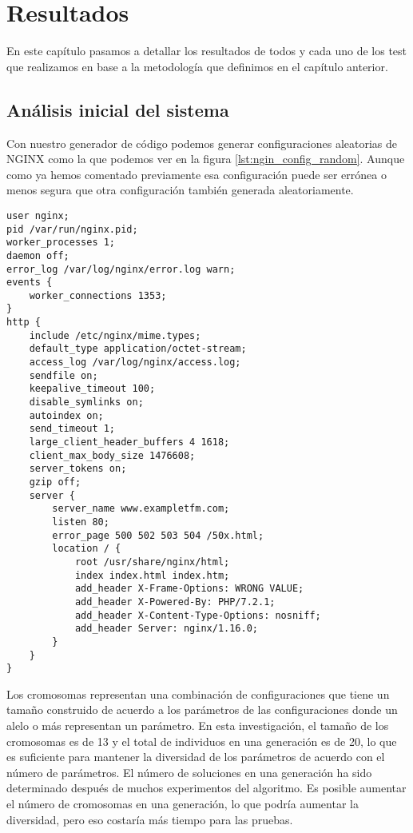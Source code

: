 \chapter{Resultados}

En este capítulo pasamos a detallar los resultados de todos y cada uno de los test que realizamos en base a la metodología que definimos en el capítulo anterior.

\section{Análisis inicial del sistema}

Con nuestro generador de código podemos generar configuraciones aleatorias de NGINX como la que podemos ver en la figura \ref{lst:ngin_config_random}. Aunque como ya hemos comentado previamente esa configuración puede ser errónea o menos segura que otra configuración también generada aleatoriamente.

\begin{lstlisting}[label={lst:nginx_config_random},caption={Ejemplo de configuración aleatoria de NGINX}]
user nginx;
pid /var/run/nginx.pid;
worker_processes 1;
daemon off;
error_log /var/log/nginx/error.log warn;
events {
    worker_connections 1353;
}
http {
    include /etc/nginx/mime.types;
    default_type application/octet-stream;
    access_log /var/log/nginx/access.log;
    sendfile on;
    keepalive_timeout 100;
    disable_symlinks on;
    autoindex on;
    send_timeout 1;
    large_client_header_buffers 4 1618;
    client_max_body_size 1476608;
    server_tokens on;
    gzip off;
    server {
        server_name www.exampletfm.com;
        listen 80;
        error_page 500 502 503 504 /50x.html;
        location / {
            root /usr/share/nginx/html;
            index index.html index.htm;
            add_header X-Frame-Options: WRONG VALUE;
            add_header X-Powered-By: PHP/7.2.1;
            add_header X-Content-Type-Options: nosniff;
            add_header Server: nginx/1.16.0;
        }
    }
}
\end{lstlisting}

Los cromosomas representan una combinación de configuraciones que tiene un tamaño construido de acuerdo a los parámetros de las configuraciones donde un alelo o más representan un parámetro. En esta investigación, el tamaño de los cromosomas es de 13 y el total de individuos en una generación es de 20, lo que es suficiente para mantener la diversidad de los parámetros de acuerdo con el número de parámetros. El número de soluciones en una generación ha sido determinado después de muchos experimentos del algoritmo. Es posible aumentar el número de cromosomas en una generación, lo que podría aumentar la diversidad, pero eso costaría más tiempo para las pruebas.

